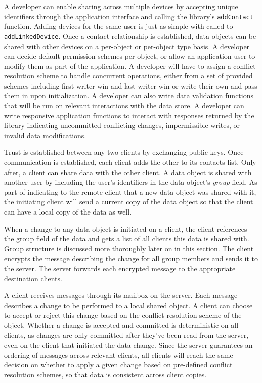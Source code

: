 A developer can enable sharing across multiple devices by accepting unique identifiers through the application interface and calling the library's \texttt{addContact} function. Adding devices for the same user is just as simple with called to \texttt{addLinkedDevice}. Once a contact relationship is established, data objects can be shared with other devices on a per-object or per-object type basis. A developer can decide default permission schemes per object, or allow an application user to modify them as part of the application. A developer will have to assign a conflict resolution scheme to handle concurrent operations, either from a set of provided schemes including first-writer-win and last-writer-win or write their own and pass them in upon initialization. A developer can also write data validation functions that will be run on relevant interactions with the data store. A developer can write responsive application functions to interact with responses returned by the library indicating uncommitted conflicting changes, impermissible writes, or invalid data modifications.



Trust is established between any two clients by exchanging public keys. Once communication is established, each client adds the other to its contacts list. Only after, a client can share data with the other client. A data object is shared with another user by including the user's identifiers in the data object's \textit{group} field. As part of indicating to the remote client that a new data object was shared with it, the initiating client will send a current copy of the data object so that the client can have a local copy of the data as well.

When a change to any data object is initiated on a client, the client references the group field of the data and gets a list of all clients this data is shared with. Group structure is discussed more thoroughly later on in this section. The client encrypts the message describing the change for all group members and sends it to the server. The server forwards each encrypted message to the appropriate destination clients. 

A client receives messages through its mailbox on the server. Each message describes a change to be performed to a local shared object. A client can choose to accept or reject this change based on the conflict resolution scheme of the object. Whether a change is accepted and committed is deterministic on all clients, as changes are only committed after they've been read from the server, even on the client that initiated the data change. Since the server guarantees an ordering of messages across relevant clients, all clients will reach the same decision on whether to apply a given change based on pre-defined conflict resolution schemes, so that data is consistent across client copies. 

